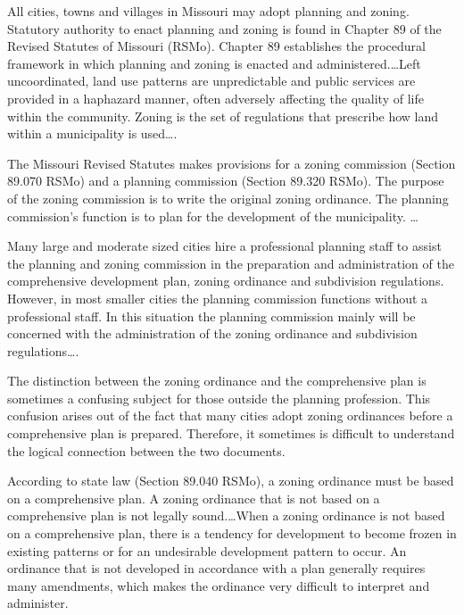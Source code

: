 
All cities, towns and villages in Missouri may adopt planning and zoning.
Statutory authority to enact planning and zoning is found in Chapter 89 of the
Revised Statutes of Missouri (RSMo). Chapter 89 establishes the procedural
framework in which planning and zoning is enacted and administered.\ldots Left
uncoordinated, land use patterns are unpredictable and public services are
provided in a haphazard manner, often adversely affecting the quality of life
within the community. Zoning is the set of regulations that prescribe how land
within a municipality is used\ldots .

The Missouri Revised Statutes makes provisions for a zoning commission (Section
89.070 RSMo) and a planning commission (Section 89.320 RSMo). The purpose of the
zoning commission is to write the original zoning ordinance. The planning
commission's function is to plan for the development of the municipality. \ldots


Many large and moderate sized cities hire a professional planning staff to
assist the planning and zoning commission in the preparation and administration
of the comprehensive development plan, zoning ordinance and subdivision
regulations. However, in most smaller cities the planning commission functions
without a professional staff. In this situation the planning commission mainly
will be concerned with the administration of the zoning ordinance and
subdivision regulations\ldots .


The distinction between the zoning ordinance and the comprehensive plan is
sometimes a confusing subject for those outside the planning profession. This
confusion arises out of the fact that many cities adopt zoning ordinances before
a comprehensive plan is prepared. Therefore, it sometimes is difficult to
understand the logical connection between the two documents.

According to state law (Section 89.040 RSMo), a zoning ordinance must be based
on a comprehensive plan. A zoning ordinance that is not based on a comprehensive
plan is not legally sound.\ldots When a zoning ordinance is not based on a
comprehensive plan, there is a tendency for development to become frozen in
existing patterns or for an undesirable development pattern to occur. An
ordinance that is not developed in accordance with a plan generally requires
many amendments, which makes the ordinance very difficult to interpret and
administer.

